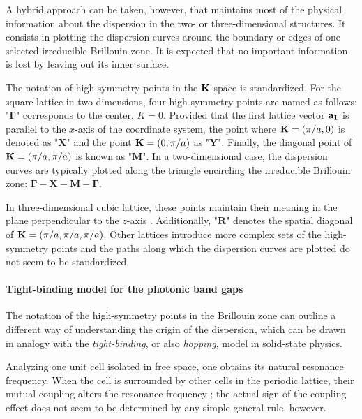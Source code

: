 A hybrid approach can be taken, however, that maintains most of the physical information about the dispersion in the two- or three-dimensional structures. It consists in plotting the  dispersion curves around the boundary or edges of one selected irreducible Brillouin zone. It is expected that no important information is lost by leaving out its inner surface.

The notation of high-symmetry points in the ${\mathbf{K}}$-space is standardized. For the square lattice in two dimensions, four high-symmetry points are named as follows: "$\mathbf{\Gamma}$" corresponds to the center, $K=0$. Provided that the first lattice vector ${\mathbf{a_1}}$ is parallel to the $x$-axis of the coordinate system, the point where ${\mathbf{K}} = (\pi/a, 0)$ is denoted as  "$\mathbf{X}$" and the point ${\mathbf{K}} = (0, \pi/a)$ as "$\mathbf{Y}$". Finally, the diagonal point of ${\mathbf{K}} = (\pi/a, \pi/a)$ is known as "$\mathbf{M}$".
In a two-dimensional case, the dispersion curves are typically plotted along the triangle encircling the irreducible Brillouin zone: $\mathbf{\Gamma}-\mathbf{X}-\mathbf{M}-\mathbf{\Gamma}$.

In three-dimensional cubic lattice, these points maintain their meaning in the plane perpendicular to the $z$-axis \cite[p. 99]{klingshirn2007semiconductor}. Additionally, "$\mathbf{R}$" denotes the spatial diagonal of ${\mathbf{K}} = (\pi/a, \pi/a, \pi/a)$. Other lattices introduce more complex sets of the high-symmetry points and the paths along which the dispersion curves are plotted do not seem to be standardized.

\paragraph{Tight-binding model for the photonic band gaps} %
The notation of the high-symmetry points in the Brillouin zone can outline a different way of understanding the origin of the dispersion, which can be drawn in analogy with the \textit{tight-binding},   %
or also \textit{hopping},  %
model in solid-state physics. 

\label{tight-binding}
Analyzing one unit cell isolated in free space, one obtains its natural resonance frequency.  When the cell is surrounded by other cells in the periodic lattice, their mutual coupling alters the resonance frequency \cite[p. 75]{klingshirn2007semiconductor}; the actual sign of the coupling effect does not seem to be determined by any simple general rule, however.	

